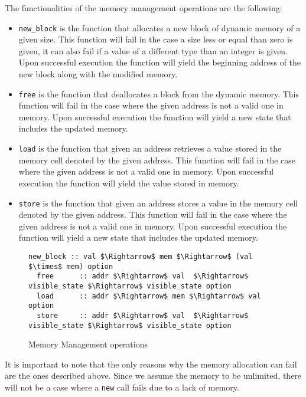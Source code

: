 The functionalities of the memory management operations are the following:

\begin{itemize}
  \item{\verb|new_block| is the function that allocates a new block of dynamic memory of a given size.
  This function will fail in the case a size less or equal than zero is given, it can also fail if a value of a different type than an integer is given.
  Upon successful execution the function will yield the beginning address of the new block along with the modified memory.}
  \item{\verb|free| is the function that deallocates a block from the dynamic memory.
  This function will fail in the case where the given address is not a valid one in memory.
  Upon successful execution the function will yield a new state that includes the updated memory.}
  \item{\verb|load| is the function that given an address retrieves a value stored in the memory cell denoted by the given address.
  This function will fail in the case where the given address is not a valid one in memory.
  Upon successful execution the function will yield the value stored in memory.}
  \item{\verb|store| is the function that given an address stores a value in the memory cell denoted by the given address.
  This function will fail in the case where the given address is not a valid one in memory.
  Upon successful execution the function will yield a new state that includes the updated memory.}
\end{itemize}

\begin{figure}
  \caption{Memory Management operations}
  \label{fig:mem_operations}

  \begin{lstlisting}[mathescape=true, frame=single]
  new_block :: val $\Rightarrow$ mem $\Rightarrow$ (val $\times$ mem) option
  free      :: addr $\Rightarrow$ val  $\Rightarrow$ visible_state $\Rightarrow$ visible_state option
  load      :: addr $\Rightarrow$ mem $\Rightarrow$ val option
  store     :: addr $\Rightarrow$ val  $\Rightarrow$ visible_state $\Rightarrow$ visible_state option
  \end{lstlisting}
\end{figure}

It is important to note that the only reasons why the memory allocation can fail are the ones described above.
Since we assume the memory to be unlimited, there will not be a case where a \verb|new| call fails due to a lack of memory.


